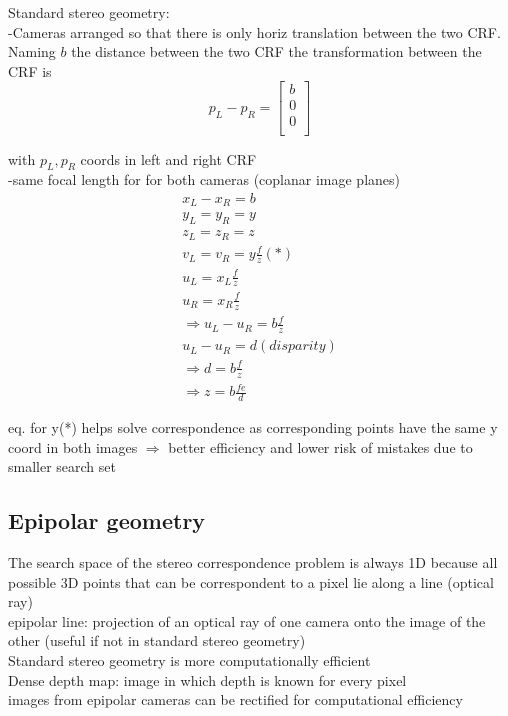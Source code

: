 \documentclass{article}
\begin{document}
Standard stereo geometry:\\
-Cameras arranged so that there is only horiz translation between the two CRF. Naming $b$ the distance between the two CRF the transformation between the CRF is
\begin{equation}
	p_L-p_R = \begin{bmatrix}
	b\\
	0\\
	0\\
	\end{bmatrix}
\end{equation}

with $p_L, p_R$ coords in left and right CRF\\
-same focal length for for both cameras (coplanar image planes)
\begin{gather*}
x_L-x_R=b\\
y_L=y_R=y\\
z_L=z_R=z\\
v_L=v_R=y \frac{f}{z} (*)\\
u_L=x_L \frac{f}{z}\\
u_R=x_R \frac{f}{z}\\
\Rightarrow u_L-u_R=b \frac{f}{z}\\
u_L-u_R=d (disparity)\\
\Rightarrow d=b \frac{f}{z}\\
\Rightarrow z = b \frac{fe}{d}
\end{gather*}

eq. for y(*) helps solve correspondence as corresponding points have the same y coord in both images $\Rightarrow$ better efficiency and lower risk of mistakes due to smaller search set
\subsection{Epipolar geometry}
The search space of the stereo correspondence problem is always 1D because all possible 3D points that can be correspondent to a pixel lie along a line (optical ray)\\
epipolar line: projection of an optical ray of one camera onto the image of the other (useful if not in standard stereo geometry)\\
Standard stereo geometry is more computationally efficient\\
Dense depth map: image in which depth is known for every pixel\\
images from epipolar cameras can be rectified for computational efficiency
\end{document}
